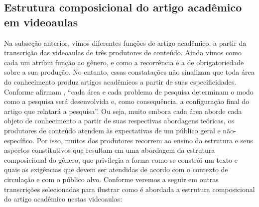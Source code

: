 \subsection{Estrutura composicional do artigo acadêmico em videoaulas}\label{sub-sec-estrutura}


Na subseção anterior, vimos diferentes funções de artigo acadêmico, a
partir da transcrição das videoaulas de três produtores de conteúdo.
Ainda vimos como cada um atribui função ao gênero, e como a recorrência
é a de obrigatoriedade sobre a sua produção. No entanto, essas
constatações não sinalizam que toda área do conhecimento produz artigos
acadêmicos a partir de suas especificidades. Conforme afirmam \textcite[p.~66]{motta-roth2010}, ``cada área e cada problema de pesquisa
determinam o modo como a pesquisa será desenvolvida e, como
consequência, a configuração final do artigo que relatará a pesquisa''.
Ou seja, muito embora cada área aborde cada objeto de conhecimento a
partir de suas respectivas abordagens teóricas, os produtores de
conteúdo atendem às expectativas de um público geral e não-específico.
Por isso, muitos dos produtores recorrem ao ensino da estrutura e seus
aspectos constitutivos que resultam em uma abordagem da estrutura
composicional do gênero, que privilegia a forma como se constrói um
texto e quais as exigências que devem ser atendidas de acordo com o
contexto de circulação e com o público alvo. Conforme veremos a seguir
em outras transcrições selecionadas para ilustrar como é abordada a
estrutura composicional do artigo acadêmico nestas videoaulas:

